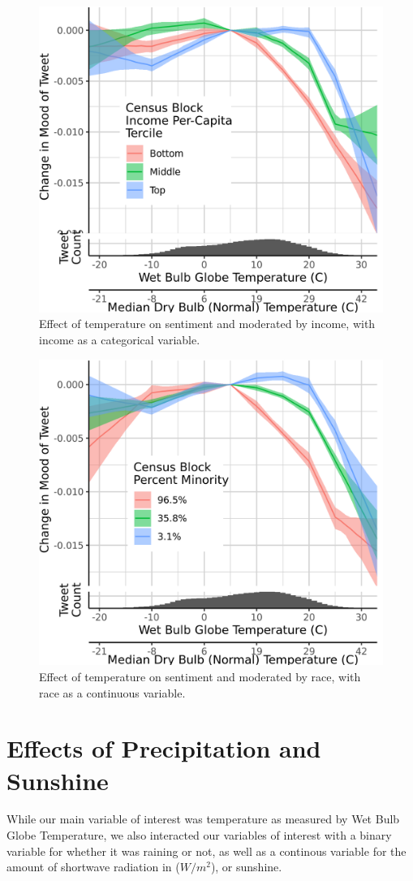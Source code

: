 \documentclass{article}
\begin{document}
\begin{figure}[H]
  \centering
  \includegraphics[width=0.6\linewidth]{../res/wbgt-income_q.png}
  \caption{Effect of temperature on sentiment and moderated by income, with income as a categorical variable.}
\end{figure}

\begin{figure}[H]
  \centering
  \includegraphics[width=0.6\linewidth]{../res/wbgt-race.png}
  \caption{Effect of temperature on sentiment and moderated by race, with race as a continuous variable.}
\end{figure}

\section{Effects of Precipitation and Sunshine}
While our main variable of interest was temperature as measured by Wet Bulb Globe Temperature, we also interacted our variables of interest with a binary variable for whether it was raining or not, as well as a continous variable for the amount of shortwave radiation in ($W/m^2$), or sunshine.
\end{document}
